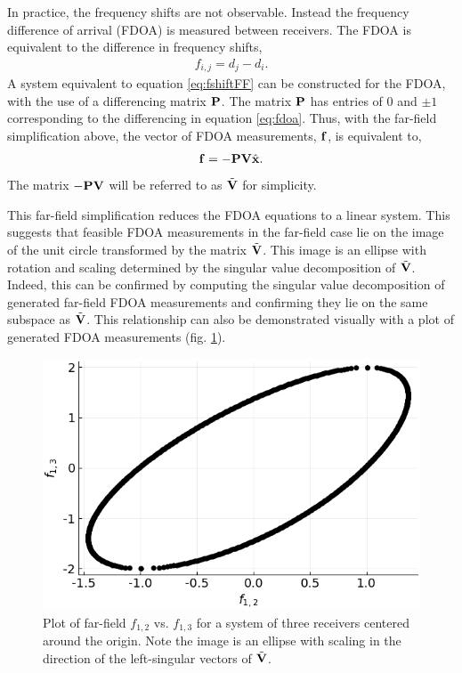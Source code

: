 In practice, the frequency shifts are not observable. Instead the frequency difference of arrival (FDOA) is measured between receivers. The FDOA is equivalent to the difference in frequency shifts,
\begin{align}
  \label{eq:fdoa}
  f_{i,j} = d_j-d_i.
\end{align}
A system equivalent to equation \ref{eq:fshiftFF} can be constructed for the FDOA, with the use of a differencing matrix $\mathbf{P}$. The matrix $\mathbf{P}$ has entries of 0 and $\pm 1$ corresponding to the differencing in equation \ref{eq:fdoa}. Thus, with the far-field simplification above, the vector of FDOA measurements, $\mathbf{f}$, is equivalent to,
\begin{align}
  \label{eq:fdoaFF}
\mathbf{f} = -\mathbf{PV}\hat{\mathbf{x}}.
\end{align}
The matrix $\mathbf{-PV}$ will be referred to as $\tilde{\mathbf{V}}$ for simplicity.

This far-field simplification reduces the FDOA equations to a linear system. This suggests that feasible FDOA measurements in the far-field case lie on the image of the unit circle transformed by the matrix $\tilde{\mathbf{V}}$. This image is an ellipse with rotation and scaling determined by the singular value decomposition of $\tilde{\mathbf{V}}$. Indeed, this can be confirmed by computing the singular value decomposition of generated far-field FDOA measurements and confirming they lie on the same subspace as $\tilde{\mathbf{V}}$. This relationship can also be demonstrated visually with a plot of generated FDOA measurements (fig. \ref{f:ellipse}).

\begin{figure}[h!]
  \includegraphics[scale=0.7]{FDOAellipse.png}
  \caption{Plot of far-field $f_{1,2}$ vs. $f_{1,3}$ for a system of three receivers centered around the origin. Note the image is an ellipse with scaling in the direction of the left-singular vectors of $\tilde{\mathbf{V}}$.}
  \label{f:ellipse}
\end{figure}

